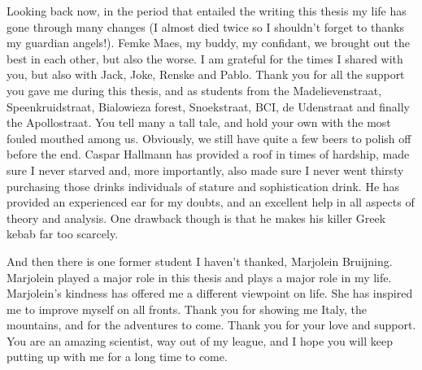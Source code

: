 \documentclass[b5paper,justified]{tufte-book} %
\begin{document}
\begin{fullwidth}
Looking back now, in the period that entailed the writing this thesis my life has gone through many changes (I almost died twice so I shouldn't forget to thanks my guardian angels!). Femke Maes, my buddy, my confidant, we brought out the best in each other, but also the worse. I am grateful for the times I shared with you, but also with Jack, Joke, Renske and Pablo. Thank you for all the support you gave me during this thesis, and as students from the Madelievenstraat, Speenkruidstraat, Bialowieza forest, Snoekstraat, BCI, de Udenstraat and finally the Apollostraat. You tell many a tall tale, and hold your own with the most fouled mouthed among us. Obviously, we still have quite a few beers to polish off before the end. Caspar Hallmann has provided a roof in times of hardship, made sure I never starved and, more importantly, also made sure I never went thirsty purchasing those drinks individuals of stature and sophistication drink. He has provided an experienced ear for my doubts, and an excellent help in all aspects of theory and analysis. One drawback though is that he makes his killer Greek kebab far too scarcely. 

And then there is one former student I haven't thanked, Marjolein Bruijning. Marjolein played a major role in this thesis and plays a major role in my life. Marjolein's kindness has offered me a different viewpoint on life. She has inspired me to improve myself on all fronts. Thank you for showing me Italy, the mountains, and for the adventures to come. Thank you for your love and support. You are an amazing scientist, way out of my league, and I hope you will keep putting up with me for a long time to come. \\


\end{fullwidth}
\end{document}
